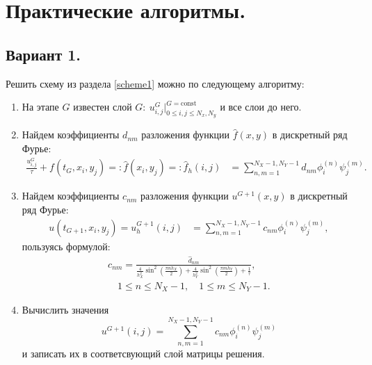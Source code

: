 \documentclass[14pt,a4paper]{extarticle}
\newcommand{\1}{\mathbbm{1}}
\begin{document}
\section{Практические алгоритмы.}
\subsection{Вариант 1.}
Решить схему из раздела \ref{scheme1} можно по следующему алгоритму:
\begin{enumerate}
    \item На этапе $G$ известен слой $G: \ u_{i, j}^{G} \big|^{G = \text{const}} _{0 \leq i, j \leq N_x, N_y}$ и все слои до него.
    \item Найдем коэффициенты $d_{nm}$ разложения функции $\hat f(x, y)$ в дискретный ряд Фурье: 
    \begin{align*}
     \frac{u^{G}_{i, j}}{\tau} + f(t_G, x_i, y_j) =: \hat f(x_i, y_j) =: \hat f_h(i, j) &= \sum_{n, m = 1}^{N_X-1, N_Y-1} \hat d_{nm} \phi ^{(n)}_i \psi ^{(m)}_j.
    \end{align*}
    \item Найдем коэффициенты $c_{nm}$ разложения функции $u^{G+1}(x, y)$ в дискретный ряд Фурье: 
    \begin{align*}
    u(t_{G+1}, x_i, y_j) = u_h^{G+1}(i, j) &= \sum_{n, m = 1}^{N_X-1, N_Y-1} c_{nm} \phi ^{(n)}_i \psi ^{(m)}_j,
    \end{align*}
    пользуясь формулой:
    \begin{align*}
    c_{nm} = \frac{ \hat d_{nm}}{\frac{4}{h_X^2} \sin ^2\left(\frac{\pi n h_X}{2}\right)
    +  \frac{4}{h_Y^2} \sin ^2\left(\frac{\pi m h_Y}{2}\right) + \frac{1}{\tau}}, \\
    \quad 1 \leq n \leq N_X-1, \quad 1 \leq m \leq N_Y-1.
    \end{align*}
    \item Вычислить значения 
    $$
    u^{G+1}(i, j) = \sum_{n, m = 1}^{N_X-1, N_Y-1} c_{nm} \phi ^{(n)}_i \psi ^{(m)}_j
    $$ 
    и записать их в соответсвующий слой матрицы решения.
\end{enumerate}
\end{document}
